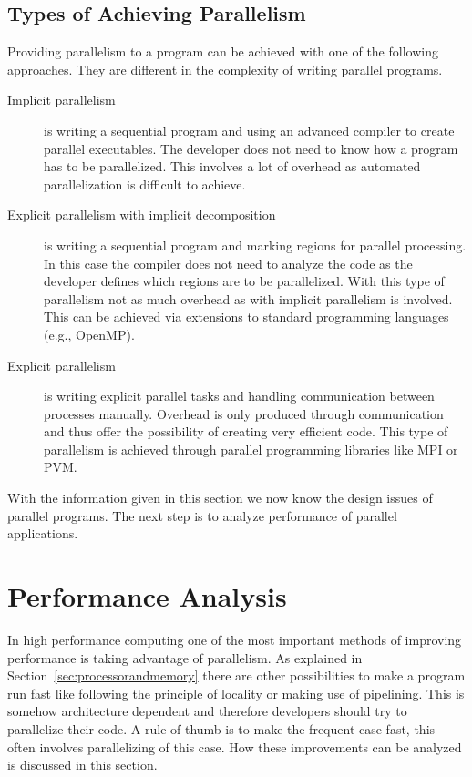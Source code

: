 \subsection{Types  of Achieving Parallelism}

Providing parallelism to a program can be achieved with one of the
following approaches. They are different in the complexity of writing
parallel programs.

\begin{description}
\item[Implicit parallelism] is writing a sequential program and using
  an advanced compiler to create parallel executables. The developer
  does not need to know how a program has to be parallelized. This
  involves a lot of overhead as automated parallelization is difficult
  to achieve.
\item[Explicit parallelism with implicit decomposition] is writing a
  sequential program and marking regions for parallel processing. In
  this case the compiler does not need to analyze the code as the
  developer defines which regions are to be parallelized. With this
  type of parallelism not as much overhead as with implicit
  parallelism is involved. This can be achieved via extensions to
  standard programming languages (e.g., OpenMP). 
\item[Explicit parallelism] is writing explicit parallel tasks and
  handling communication between processes
  manually. Overhead is only produced through communication and thus
  offer the possibility of creating very efficient code. This type of
  parallelism is achieved through parallel programming libraries like
  MPI or PVM.
\end{description}


With the information given in this section we now know the design
issues of parallel programs. The next step is to analyze performance
of parallel applications.

\section{Performance Analysis}
\label{sec:perf_analysis}

In high performance computing one of the most important methods of
improving performance is taking advantage of parallelism. As explained
in Section~\ref{sec:processorandmemory} there are other possibilities
to make a program run fast like following the principle of locality
or making use of pipelining. This is somehow architecture
dependent and therefore developers should try to parallelize their
code. A rule of thumb is to make the frequent case fast, this often
involves parallelizing of this case. How these improvements can be
analyzed is discussed in this section.

